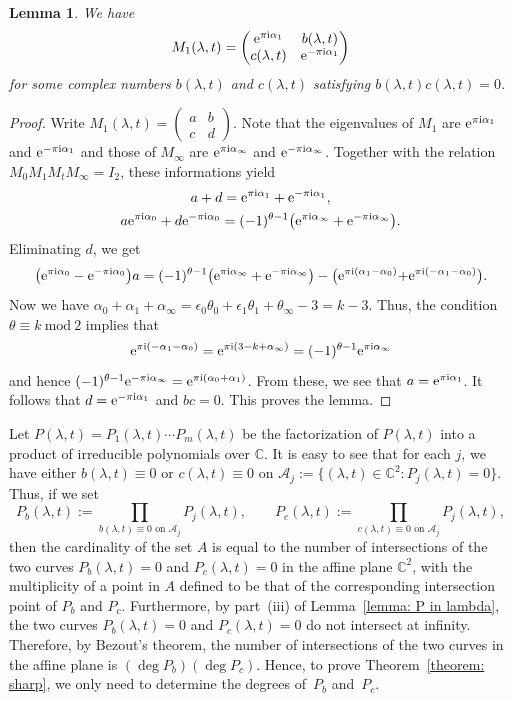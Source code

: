 \documentclass[pdftex]{sigma}
\numberwithin{equation}{section}
\newtheorem{Lemma}[Theorem]{Lemma}
\def\C{\mathbb C}
\def\mod{\ \mathrm{mod}\ }
\def\M#1#2#3#4{\begin{pmatrix}#1&#2\\#3&#4\end{pmatrix}}
\def\SM#1#2#3#4{\left(\begin{smallmatrix}#1&#2\\#3&#4\end{smallmatrix}
 \right)}
\begin{document}
\begin{Lemma} We have
\[
M_1(\lambda,t)=\M{{\rm e}^{\pi {\rm i}\alpha_1}}{b(\lambda,t)}{c(\lambda,t)}
{{\rm e}^{-\pi {\rm i}\alpha_1}}
\]
for some complex numbers $b(\lambda,t)$ and $c(\lambda,t)$ satisfying
$b(\lambda,t)c(\lambda,t)=0$.
\end{Lemma}

\begin{proof} Write $M_1(\lambda,t)=\SM abcd$. Note that the
 eigenvalues of $M_1$ are ${\rm e}^{\pi {\rm i}\alpha_1}$ and ${\rm e}^{-\pi
 {\rm i}\alpha_1}$ and those of $M_\infty$ are ${\rm e}^{\pi {\rm i}\alpha_\infty}$
 and ${\rm e}^{-\pi {\rm i}\alpha_\infty}$. Together with the relation
 $M_0M_1M_tM_\infty=I_2$, these informations yield
 \begin{gather*}
 a+d={\rm e}^{\pi {\rm i}\alpha_1}+{\rm e}^{-\pi {\rm i}\alpha_1}, \\
 a{\rm e}^{\pi {\rm i}\alpha_0}+d{\rm e}^{-\pi {\rm i}\alpha_0}
 =(-1)^{\theta-1}\bigl({\rm e}^{\pi {\rm i}\alpha_\infty}+{\rm e}^{-\pi {\rm i}\alpha_\infty}\bigr).
 \end{gather*}
 Eliminating $d$, we get
\[
 \bigl({\rm e}^{\pi {\rm i}\alpha_0}-{\rm e}^{-\pi {\rm i}\alpha_0}\bigr)a
 =(-1)^{\theta-1}\bigl({\rm e}^{\pi {\rm i}\alpha_\infty}+{\rm e}^{-\pi {\rm i}\alpha_\infty}\bigr)
 -\bigl({\rm e}^{\pi {\rm i}(\alpha_1-\alpha_0)}{+{\rm e}^{\pi {\rm i}(-\alpha_1-\alpha_0)}}\bigr).
\]
 Now we have $\alpha_0+\alpha_1+\alpha_\infty=\epsilon_0\theta_0
 +\epsilon_1\theta_1+\theta_\infty-3=k-3$. Thus, the condition
 $\theta\equiv k\mod 2$ implies that
\[
 {\rm e}^{\pi {\rm i}(-\alpha_1-\alpha_0)}={\rm e}^{\pi {\rm i}(3-k+\alpha_\infty)}
 =(-1)^{\theta-1}{\rm e}^{\pi {\rm i}\alpha_\infty}
\]
 and hence $(-1)^{\theta-1}{\rm e}^{-\pi {\rm i}\alpha_\infty}
 ={\rm e}^{\pi {\rm i}(\alpha_0+\alpha_1)}$.
 From these, we see that $a={\rm e}^{\pi {\rm i}\alpha_1}$. It follows that
 $d={\rm e}^{-\pi {\rm i}\alpha_1}$ and $bc=0$. This proves the lemma.
\end{proof}

Let $P(\lambda,t)=P_1(\lambda,t)\cdots P_m(\lambda,t)$ be
the factorization of $P(\lambda,t)$ into a product of irreducible
polynomials over $\C$. It is easy to see that for each $j$, we have
either $b(\lambda,t)\equiv 0$ or $c(\lambda,t)\equiv 0$ on $\mathcal
A_j:=\bigl\{(\lambda,t)\in\C^2\colon P_j(\lambda,t)=0\bigr\}$. Thus, if we set
\[
 P_b(\lambda,t):=\prod_{b(\lambda,t)\equiv 0\text{ on }\mathcal A_j}
 P_j(\lambda,t), \qquad
 P_c(\lambda,t):=\prod_{c(\lambda,t)\equiv 0\text{ on }\mathcal A_j}
 P_j(\lambda,t),
\]
then the cardinality of the set $A$ is equal to the number of
intersections of the two curves $P_b(\lambda,t)=0$ and
$P_c(\lambda,t)=0$ in the affine plane $\C^2$, with the multiplicity
of a point in $A$ defined to be that of the corresponding intersection
point of $P_b$ and $P_c$. Furthermore, by part~(iii) of Lemma~\ref{lemma: P in lambda}, the two curves $P_b(\lambda,t)=0$ and
$P_c(\lambda,t)=0$ do not intersect at infinity. Therefore, by
Bezout's theorem, the number of intersections of the two curves in the
affine plane is $(\deg P_b)(\deg P_c)$. Hence, to prove Theorem~\ref{theorem: sharp}, we only need to determine the degrees of~$P_b$
and~$P_c$.
\end{document}
